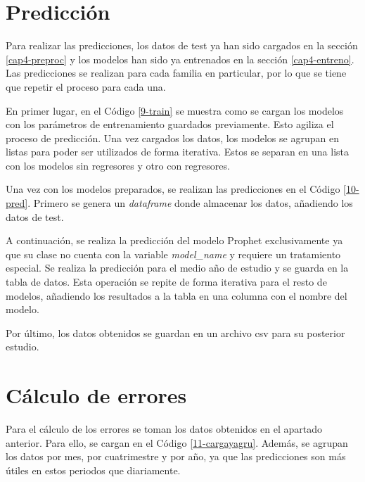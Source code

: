 

\section{Predicción}

Para realizar las predicciones, los datos de test ya han sido cargados en la sección \ref{cap4-preproc} y los modelos han sido ya entrenados en la sección \ref{cap4-entreno}. Las predicciones se realizan para cada familia en particular, por lo que se tiene que repetir el proceso para cada una.

En primer lugar, en el Código \ref{9-train} se muestra como se cargan los modelos con los parámetros de entrenamiento guardados previamente. Esto agiliza el proceso de predicción. Una vez cargados los datos, los modelos se agrupan en listas para poder ser utilizados de forma iterativa. Estos se separan en una lista con los modelos sin regresores y otro con regresores.



Una vez con los modelos preparados, se realizan las predicciones en el Código \ref{10-pred}. Primero se genera un \textit{dataframe} donde almacenar los datos, añadiendo los datos de test.

A continuación, se realiza la predicción del modelo Prophet exclusivamente ya que su clase no cuenta con la variable \textit{model\_name} y requiere un tratamiento especial. Se realiza la predicción para el medio año de estudio y se guarda en la tabla de datos. Esta operación se repite de forma iterativa para el resto de modelos, añadiendo los resultados a la tabla en una columna con el nombre del modelo.

Por último, los datos obtenidos se guardan en un archivo csv para su posterior estudio.



\section{Cálculo de errores}

Para el cálculo de los errores se toman los datos obtenidos en el apartado anterior. Para ello, se cargan en el Código \ref*{11-cargayagru}. Además, se agrupan los datos por mes, por cuatrimestre y por año, ya que las predicciones son más útiles en estos periodos que diariamente. 






